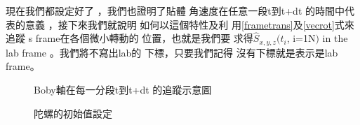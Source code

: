 \documentclass[12pt,a4paper]{article}
\begin{document}
現在我們都設定好了%
，我們也證明了貼體%
角速度在任意一段t到t+dt%
的時間中代表的意義%
，接下來我們就說明%
如何以這個特性及利%
用\ref{frametrans}及\ref{vecrot}式來追蹤%
s frame在各個微小轉動的%
位置，也就是我們要%
求得$\hat{S}_{x,y,z}(t_{i}$, i=1N$)$ in the lab frame%
。\bigskip 我們將不寫出lab的%
下標，只要我們記得%
沒有下標就是表示是lab
frame。

\begin{figure}[th]
\caption{Boby軸在每一分段t到t+dt%
的追蹤示意圖}
\begin{center}
\end{center}
\end{figure}

\begin{figure}[th]
\caption{陀螺的初始值設定}
\begin{center}
\end{center}
\end{figure}
\end{document}
